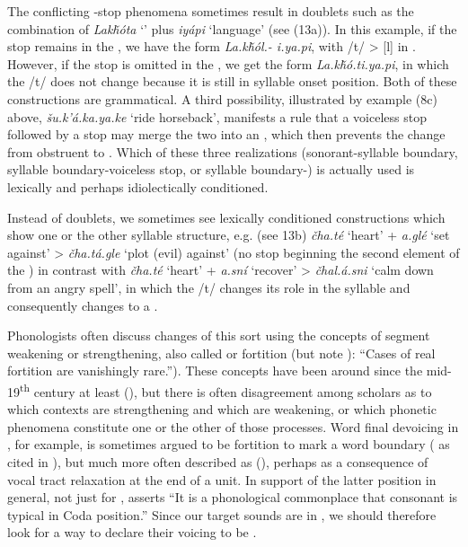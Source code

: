 \documentclass[output=paper]{LSP/langsci}
\begin{document}
The conflicting -stop phenomena sometimes result in doublets such as the combination of \textit{Lak\v{h}\'ota} `' plus \textit{iy\'api} `language' (see (13a)). In this example, if the  stop remains in the , we have the form \textit{La.k\v{h}\'ol.- i.ya.pi}, with /t/ > [l] in . However, if the  stop is omitted in the , we get the form \textit{La.k\v{h}\'o.ti.ya.pi}, in which the /t/ does not change because it is still in syllable onset position. Both of these constructions are grammatical. A third possibility, illustrated by example (8c) above, \textit{\v{s}u.k'\'a.ka.ya.ke} `ride horseback', manifests a rule that a voiceless stop followed by a  stop may merge the two into an , which then prevents the change from obstruent to . Which of these three realizations (sonorant-syllable boundary, syllable boundary-voiceless stop, or syllable boundary-) is actually used is lexically and perhaps idiolectically conditioned.

Instead of doublets, we sometimes see lexically conditioned constructions which show one or the other syllable structure, e.g. (see 13b) \textit{\v{c}ha.t\'e} `heart' + \textit{a.gl\'e} `set against' > \textit{\v{c}ha.t\'a.gle} `plot (evil) against' (no  stop beginning the second element of the ) in contrast with \textit{\v{c}ha.t\'e} `heart' + \textit{a.sn\'i} `recover' > \textit{\v{c}hal.\'a.sni} `calm down from an angry spell', in which the /t/ changes its role in the syllable and consequently changes to a .

Phonologists often discuss changes of this sort using the concepts of segment weakening or strengthening, also called  or fortition (but note \citealt[10]{Honeybone2008}): ``Cases of real fortition are vanishingly rare.''). These concepts have been around since the mid-19\textsuperscript{th} century at least (\citealt{Honeybone2008}), but there is often disagreement among scholars as to which contexts are strengthening and which are weakening, or which phonetic phenomena constitute one or the other of those processes. Word final devoicing in , for example, is sometimes argued to be fortition to mark a word boundary (\citealt{IversonSalmons2007} as cited in \citealt{Harris2009}), but much more often described as  (\citealt{Harris2009}), perhaps as a consequence of vocal tract relaxation at the end of a unit. In support of the latter position in general, not just for , \citet[112]{Szigetvari2008} asserts ``It is a phonological commonplace that consonant  is typical in Coda position.'' Since our target sounds are in , we should therefore look for a way to declare their voicing to be .
\end{document}
